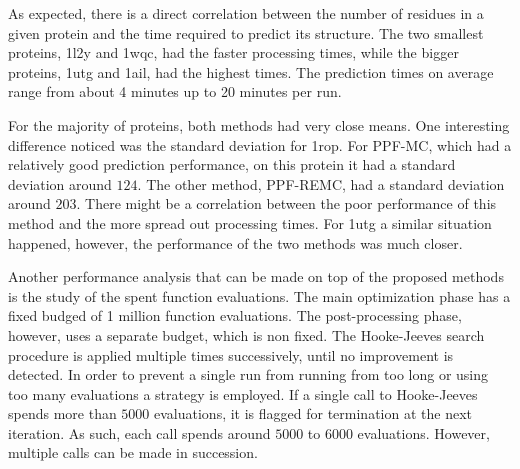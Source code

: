 As expected, there is a direct correlation between the number of residues in a
given protein and the time required to predict its structure. The two smallest
proteins, 1l2y and 1wqc, had the faster processing times, while the bigger proteins,
1utg and 1ail, had the
highest times. The prediction times on average range from about 4 minutes up to
20 minutes per run.

For the majority of proteins, both methods had very close means. One interesting
difference noticed was the standard deviation for 1rop. For PPF-MC,
which had a relatively good prediction performance, on this protein it had
a standard deviation around $124$. The other method, PPF-REMC, had a
standard deviation around $203$. There might be a correlation between the
poor performance of this method and the more spread out processing times.
For 1utg a similar situation happened, however, the performance of the two
methods was much closer.

Another performance analysis that can be made on top of the proposed methods
is the study of the spent function evaluations. The main optimization phase has
a fixed budged of 1 million function evaluations. The post-processing phase,
however, uses a separate budget, which is non fixed. The Hooke-Jeeves
search procedure is applied multiple times successively, until no improvement
is detected. In order to prevent a single run from running from too long or
using too many evaluations a strategy is employed. If a single call to
Hooke-Jeeves spends more than $5000$ evaluations, it is flagged for termination
at the next iteration. As such, each call spends around $5000$ to $6000$
evaluations. However, multiple calls can be made in succession.

